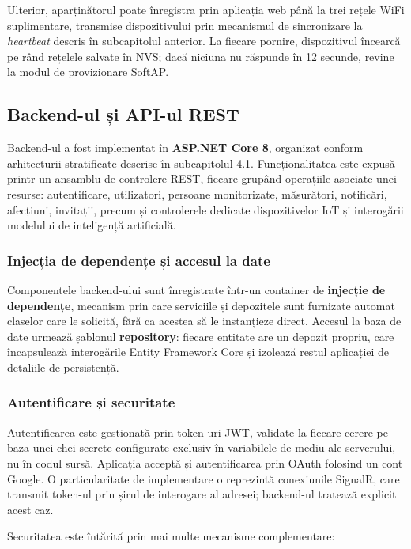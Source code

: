 \documentclass[12pt,a4paper,twoside]{article}
\begin{document}
Ulterior, aparținătorul poate înregistra prin aplicația web până la trei rețele WiFi suplimentare, transmise dispozitivului prin mecanismul de sincronizare la \textit{heartbeat} descris în subcapitolul anterior. La fiecare pornire, dispozitivul încearcă pe rând rețelele salvate în NVS; dacă niciuna nu răspunde în 12 secunde, revine la modul de provizionare SoftAP.

\subsection{Backend-ul și API-ul REST}

Backend-ul a fost implementat în \textbf{ASP.NET Core 8}, organizat conform arhitecturii stratificate descrise în subcapitolul 4.1. Funcționalitatea este expusă printr-un ansamblu de controlere REST, fiecare grupând operațiile asociate unei resurse: autentificare, utilizatori, persoane monitorizate, măsurători, notificări, afecțiuni, invitații, precum și controlerele dedicate dispozitivelor IoT și interogării modelului de inteligență artificială.

\subsubsection{Injecția de dependențe și accesul la date}

Componentele backend-ului sunt înregistrate într-un container de \textbf{injecție de dependențe}, mecanism prin care serviciile și depozitele sunt furnizate automat claselor care le solicită, fără ca acestea să le instanțieze direct. Accesul la baza de date urmează șablonul \textbf{repository}: fiecare entitate are un depozit propriu, care încapsulează interogările Entity Framework Core și izolează restul aplicației de detaliile de persistență.

\subsubsection{Autentificare și securitate}

Autentificarea este gestionată prin token-uri JWT, validate la fiecare cerere pe baza unei chei secrete configurate exclusiv în variabilele de mediu ale serverului, nu în codul sursă. Aplicația acceptă și autentificarea prin OAuth folosind un cont Google. O particularitate de implementare o reprezintă conexiunile SignalR, care transmit token-ul prin șirul de interogare al adresei; backend-ul tratează explicit acest caz.

Securitatea este întărită prin mai multe mecanisme complementare:
\end{document}
